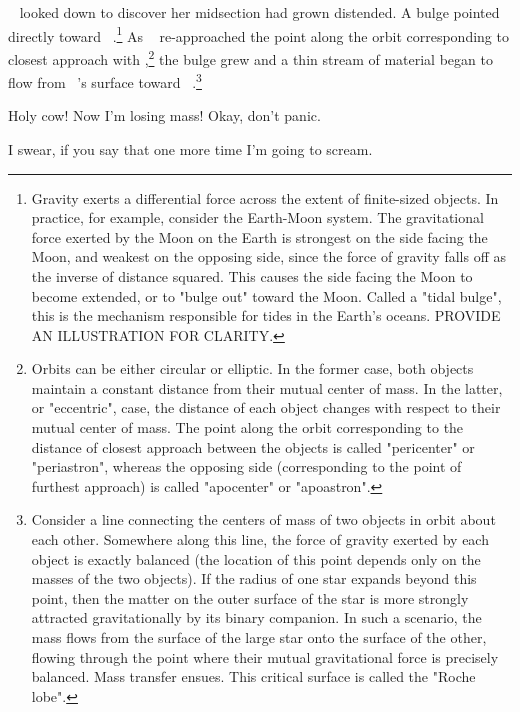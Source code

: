 \documentclass[main.tex]{subfiles}
\begin{document}
\par \nar \rmmaia~ looked down to discover her midsection had grown distended.  A bulge pointed directly toward \rmmerope~.\footnote{Gravity exerts a differential force across the extent of finite-sized objects.  In practice, for example, consider the Earth-Moon system.  The gravitational force exerted by the Moon on the Earth is strongest on the side facing the Moon, and weakest on the opposing side, since the force of gravity falls off as the inverse of distance squared.  This causes the side facing the Moon to become extended, or to "bulge out" toward the Moon.  Called a "tidal bulge", this is the mechanism responsible for tides in the Earth's oceans. PROVIDE AN ILLUSTRATION FOR CLARITY.}  As \rmmerope~ re-approached the point along the orbit corresponding to closest approach with \rmmerope,\footnote{Orbits can be either circular or elliptic.  In the former case, both objects maintain a constant distance from their mutual center of mass.  In the latter, or "eccentric", case, the distance of each object changes with respect to their mutual center of mass.  The point along the orbit corresponding to the distance of closest approach between the objects is called "pericenter" or "periastron", whereas the opposing side (corresponding to the point of furthest approach) is called "apocenter" or "apoastron".} the bulge grew and a thin stream of material began to flow from \rmmaia~'s surface toward \rmmerope~.\footnote{Consider a line connecting the centers of mass of two objects in orbit about each other.  Somewhere along this line, the force of gravity exerted by each object is exactly balanced (the location of this point depends only on the masses of the two objects).  If the radius of one star expands beyond this point, then the matter on the outer surface of the star is more strongly attracted gravitationally by its binary companion.  In such a scenario, the mass flows from the surface of the large star onto the surface of the other, flowing through the point where their mutual gravitational force is precisely balanced.  Mass transfer ensues.  This critical surface is called the "Roche lobe".}

\par \Maia Holy cow!  Now I'm losing mass! Okay, don't panic.

\par \Merope I swear, if you say that one more time I'm going to scream.
\end{document}
